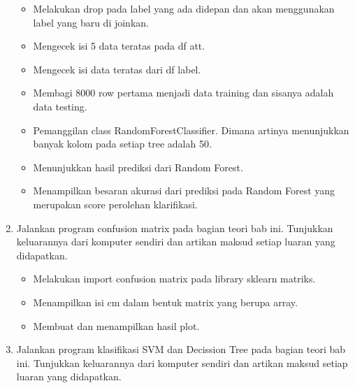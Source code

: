 \begin{enumerate}
\begin{itemize}
		
		\item Melakukan drop pada label yang ada didepan dan akan menggunakan label yang baru di joinkan.
		
		\item Mengecek isi 5 data teratas pada df att.
		
		\item Mengecek isi data teratas dari df label.
		
		\item Membagi 8000 row pertama menjadi data training dan sisanya adalah data testing.
		
		\item Pemanggilan class RandomForestClassifier. Dimana artinya menunjukkan banyak kolom pada setiap tree adalah 50.
		
		\item Menunjukkan hasil prediksi dari Random Forest.
		
		\item Menampilkan besaran akurasi dari prediksi pada Random Forest yang merupakan score perolehan klarifikasi.
		
	\end{itemize}
	\item Jalankan program confusion matrix pada bagian teori bab ini. Tunjukkan keluarannya dari komputer sendiri dan artikan maksud setiap luaran yang didapatkan.
	\hfill\break
	\begin{itemize}
		\item Melakukan import confusion matrix pada library sklearn matriks.
		
		\item Menampilkan isi cm dalam bentuk matrix yang berupa array.
		
		\item Membuat dan menampilkan hasil plot.
		
	\end{itemize}
	\item Jalankan program klasifikasi SVM dan Decission Tree pada bagian teori bab ini. Tunjukkan keluarannya dari komputer sendiri dan artikan maksud setiap luaran yang didapatkan.

\end{enumerate}

